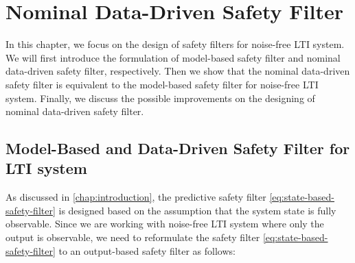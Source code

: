 \chapter{Nominal Data-Driven Safety Filter}\label{chap:nominal-ddsf}

In this chapter, we focus on the design of safety filters for noise-free LTI system.
We will first introduce the formulation of model-based safety filter and nominal data-driven safety filter, respectively.
Then we show that the nominal data-driven safety filter is equivalent to the model-based safety filter for noise-free LTI system.
Finally, we discuss the possible improvements on the designing of nominal data-driven safety filter.


\section{Model-Based and Data-Driven Safety Filter for LTI system}\label{sec:formulation-nominal}

As discussed in \cref{chap:introduction}, the predictive safety filter \cref{eq:state-based-safety-filter} is designed based on the assumption that the system state is fully observable.
Since we are working with noise-free LTI system where only the output is observable, we need to reformulate the safety filter \cref{eq:state-based-safety-filter} to an output-based safety filter as follows:

